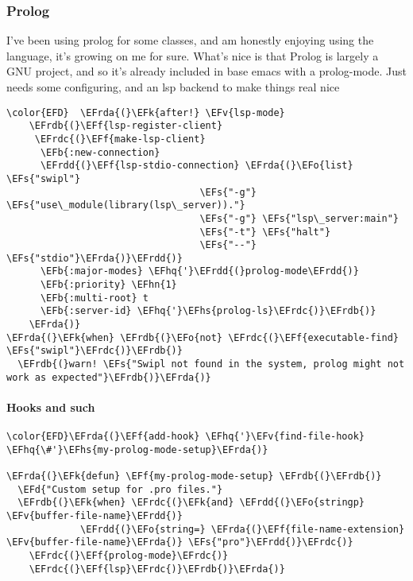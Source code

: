 \documentclass{article}
\newcommand{\EFs}[1]{\textcolor{EFs}{#1}} %
\newcommand{\EFd}[1]{\textcolor{EFd}{#1}} %
\newcommand{\EFk}[1]{\textcolor{EFk}{#1}} %
\newcommand{\EFb}[1]{\textcolor{EFb}{#1}} %
\newcommand{\EFf}[1]{\textcolor{EFf}{#1}} %
\newcommand{\EFv}[1]{\textcolor{EFv}{#1}} %
\newcommand{\EFo}[1]{\textcolor{EFo}{#1}} %
\newcommand{\EFhn}[1]{\textcolor{EFhn}{\textbf{#1}}} %
\newcommand{\EFhq}[1]{#1} %
\newcommand{\EFhs}[1]{\textcolor{EFhs}{#1}} %
\newcommand{\EFrda}[1]{\textcolor{EFrda}{#1}} %
\newcommand{\EFrdb}[1]{\textcolor{EFrdb}{#1}} %
\newcommand{\EFrdc}[1]{\textcolor{EFrdc}{#1}} %
\newcommand{\EFrdd}[1]{\textcolor{EFrdd}{#1}} %
\begin{document}
\subsubsection{Prolog}
\label{sec:org2bb58f4}
I've been using prolog for some classes, and am honestly enjoying using the language, it's growing on me for sure. What's nice is that Prolog is largely a GNU project, and so it's already included in base emacs with a prolog-mode. Just needs some configuring, and an lsp backend to make things real nice
\begin{Code}
\begin{Verbatim}
\color{EFD}  \EFrda{(}\EFk{after!} \EFv{lsp-mode}
    \EFrdb{(}\EFf{lsp-register-client}
     \EFrdc{(}\EFf{make-lsp-client}
      \EFb{:new-connection}
      \EFrdd{(}\EFf{lsp-stdio-connection} \EFrda{(}\EFo{list} \EFs{"swipl"}
                                  \EFs{"-g"} \EFs{"use\_module(library(lsp\_server))."}
                                  \EFs{"-g"} \EFs{"lsp\_server:main"}
                                  \EFs{"-t"} \EFs{"halt"}
                                  \EFs{"--"} \EFs{"stdio"}\EFrda{)}\EFrdd{)}
      \EFb{:major-modes} \EFhq{'}\EFrdd{(}prolog-mode\EFrdd{)}
      \EFb{:priority} \EFhn{1}
      \EFb{:multi-root} t
      \EFb{:server-id} \EFhq{'}\EFhs{prolog-ls}\EFrdc{)}\EFrdb{)}
    \EFrda{)}
\EFrda{(}\EFk{when} \EFrdb{(}\EFo{not} \EFrdc{(}\EFf{executable-find} \EFs{"swipl"}\EFrdc{)}\EFrdb{)}
  \EFrdb{(}warn! \EFs{"Swipl not found in the system, prolog might not work as expected"}\EFrdb{)}\EFrda{)}
\end{Verbatim}
\end{Code}

\paragraph{Hooks and such}
\label{sec:org387ce2c}
\begin{Code}
\begin{Verbatim}
\color{EFD}\EFrda{(}\EFf{add-hook} \EFhq{'}\EFv{find-file-hook} \EFhq{\#'}\EFhs{my-prolog-mode-setup}\EFrda{)}

\EFrda{(}\EFk{defun} \EFf{my-prolog-mode-setup} \EFrdb{(}\EFrdb{)}
  \EFd{"Custom setup for .pro files."}
  \EFrdb{(}\EFk{when} \EFrdc{(}\EFk{and} \EFrdd{(}\EFo{stringp} \EFv{buffer-file-name}\EFrdd{)}
             \EFrdd{(}\EFo{string=} \EFrda{(}\EFf{file-name-extension} \EFv{buffer-file-name}\EFrda{)} \EFs{"pro"}\EFrdd{)}\EFrdc{)}
    \EFrdc{(}\EFf{prolog-mode}\EFrdc{)}
    \EFrdc{(}\EFf{lsp}\EFrdc{)}\EFrdb{)}\EFrda{)}
\end{Verbatim}
\end{Code}
\end{document}
